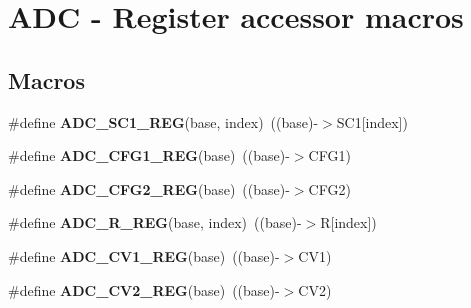 \hypertarget{group___a_d_c___register___accessor___macros}{}\section{A\+DC -\/ Register accessor macros}
\label{group___a_d_c___register___accessor___macros}
\subsection*{Macros}
\begin{DoxyCompactItemize}
\item 
\mbox{\label{group___a_d_c___register___accessor___macros_ga1b28fcb3112387441ecc5fe9251a32e9}} 
\#define {\bfseries A\+D\+C\+\_\+\+S\+C1\+\_\+\+R\+EG}(base,  index)~((base)-\/$>$S\+C1\mbox{[}index\mbox{]})
\item 
\mbox{\label{group___a_d_c___register___accessor___macros_gaa64d6563b96bb9c13693c466528decd7}} 
\#define {\bfseries A\+D\+C\+\_\+\+C\+F\+G1\+\_\+\+R\+EG}(base)~((base)-\/$>$C\+F\+G1)
\item 
\mbox{\label{group___a_d_c___register___accessor___macros_gad5bd555e9653cefc30e9fdb2834f7a57}} 
\#define {\bfseries A\+D\+C\+\_\+\+C\+F\+G2\+\_\+\+R\+EG}(base)~((base)-\/$>$C\+F\+G2)
\item 
\mbox{\label{group___a_d_c___register___accessor___macros_gaecd126e0e0812785b36331de88019dde}} 
\#define {\bfseries A\+D\+C\+\_\+\+R\+\_\+\+R\+EG}(base,  index)~((base)-\/$>$R\mbox{[}index\mbox{]})
\item 
\mbox{\label{group___a_d_c___register___accessor___macros_ga8b184f4f094f655e551a528ee645df65}} 
\#define {\bfseries A\+D\+C\+\_\+\+C\+V1\+\_\+\+R\+EG}(base)~((base)-\/$>$C\+V1)
\item 
\mbox{\label{group___a_d_c___register___accessor___macros_gac443a67da1afc78c3f8a34426efd7fdc}} 
\#define {\bfseries A\+D\+C\+\_\+\+C\+V2\+\_\+\+R\+EG}(base)~((base)-\/$>$C\+V2)

\end{DoxyCompactItemize}
